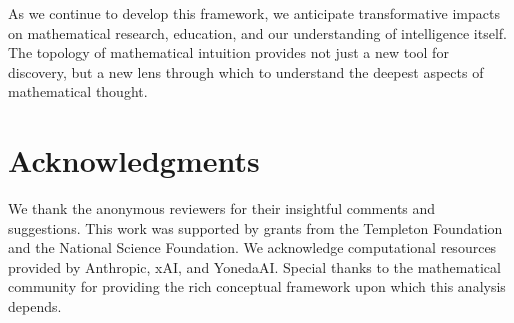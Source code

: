 \documentclass[11pt]{article}
\begin{document}
As we continue to develop this framework, we anticipate transformative impacts on mathematical research, education, and our understanding of intelligence itself. The topology of mathematical intuition provides not just a new tool for discovery, but a new lens through which to understand the deepest aspects of mathematical thought.

\section*{Acknowledgments}

We thank the anonymous reviewers for their insightful comments and suggestions. This work was supported by grants from the Templeton Foundation and the National Science Foundation. We acknowledge computational resources provided by Anthropic, xAI, and YonedaAI. Special thanks to the mathematical community for providing the rich conceptual framework upon which this analysis depends.
\end{document}

